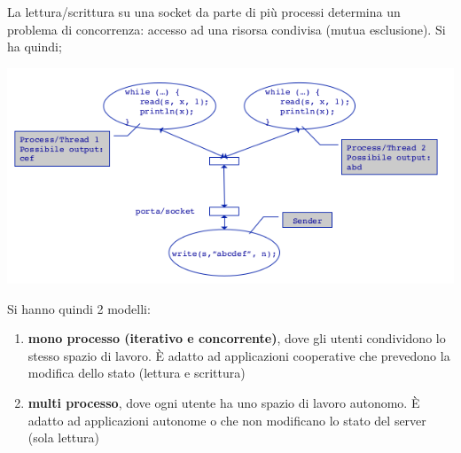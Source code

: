 \documentclass[a4paper,12pt, oneside]{book}
\begin{document}
La lettura/scrittura su una socket da parte di più processi
determina un problema di concorrenza: accesso ad una
risorsa condivisa (mutua esclusione). Si ha quindi;
\begin{center}
	\includegraphics[scale=0.7]{img/ex.png}
\end{center}
Si hanno quindi 2 modelli:
\begin{enumerate}
	\item \textbf{mono processo (iterativo e concorrente)}, dove gli utenti condividono lo stesso spazio di lavoro. È adatto ad applicazioni cooperative che prevedono la modifica
	      dello stato (lettura e scrittura)
	\item \textbf{multi processo}, dove ogni utente ha uno spazio di lavoro autonomo. È adatto ad applicazioni autonome o che non modificano lo stato del server (sola lettura)
\end{enumerate}
\end{document}
